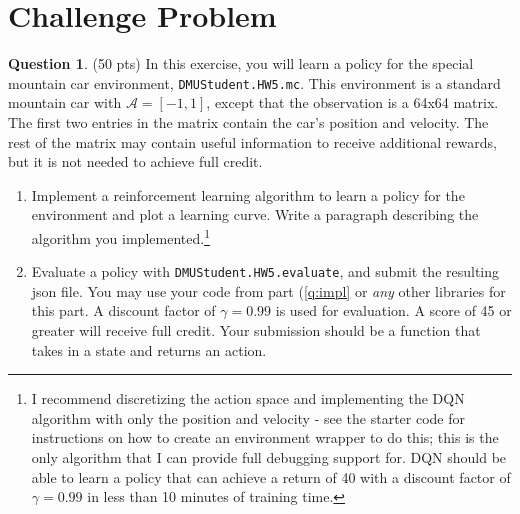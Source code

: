 \documentclass{article}
\theoremstyle{definition}
\newtheorem{question}[thm]{Question}
\begin{document}
\section{Challenge Problem}

\begin{question}
    (50 pts) In this exercise, you will learn a policy for the special mountain car environment, \texttt{DMUStudent.HW5.mc}. This environment is a standard mountain car with $\mathcal{A}=[-1, 1]$, except that the observation is a 64x64 matrix. The first two entries in the matrix contain the car's position and velocity. The rest of the matrix may contain useful information to receive additional rewards, but it is not needed to achieve full credit.
    \begin{enumerate}[label=\alph*)]
        \item Implement a reinforcement learning algorithm to learn a policy for the environment and plot a learning curve. Write a paragraph describing the algorithm you implemented.\footnote{I recommend discretizing the action space and implementing the DQN algorithm with only the position and velocity - see the starter code for instructions on how to create an environment wrapper to do this; this is the only algorithm that I can provide full debugging support for. DQN should be able to learn a policy that can achieve a return of 40 with a discount factor of $\gamma=0.99$ in less than 10 minutes of training time.}\label{q:impl}
        \item Evaluate a policy with \texttt{DMUStudent.HW5.evaluate}, and submit the resulting json file. You may use your code from part (\ref{q:impl} or \emph{any} other libraries for this part. A discount factor of $\gamma=0.99$ is used for evaluation. A score of 45 or greater will receive full credit. Your submission should be a function that takes in a state and returns an action.
    \end{enumerate}
\end{question}
\end{document}

